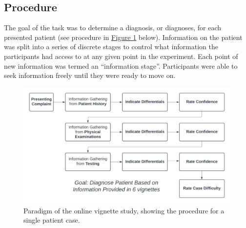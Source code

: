 \documentclass[a4paper, nobind]{templates/ociamthesis}
\begin{document}
\subsection{Procedure}\label{procedure}

The goal of the task was to determine a diagnosis, or diagnoses, for each presented patient (see procedure in \hyperref[fig:paradigm]{Figure \ref{fig:paradigm}} below). Information on the patient was split into a series of discrete stages to control what information the participants had access to at any given point in the experiment. Each point of new information was termed an ``information stage''. Participants were able to seek information freely until they were ready to move on.\\

\begin{figure}[H]

{\centering \includegraphics[width=1\linewidth]{./assets/Paradigm} 

}

\caption{Paradigm of the online vignette study, showing the procedure for a single patient case.}\label{fig:paradigm}
\end{figure}

\newpage
\end{document}
